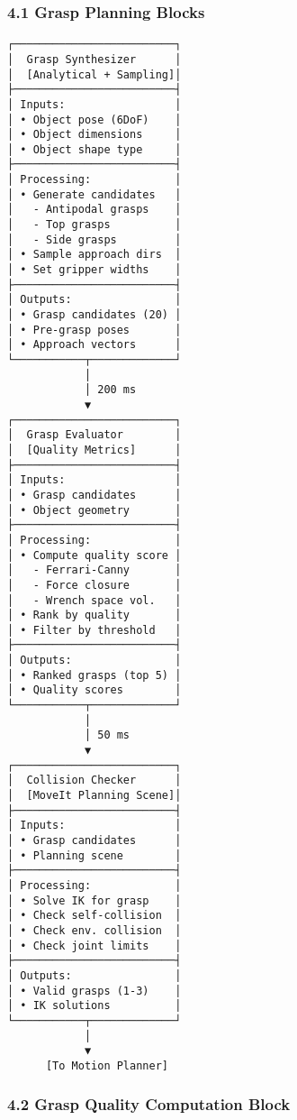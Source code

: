 \documentclass[
]{article}
\begin{document}
\hypertarget{grasp-planning-blocks}{%
\subsubsection{4.1 Grasp Planning Blocks}\label{grasp-planning-blocks}}

\begin{verbatim}
┌─────────────────────────┐
│  Grasp Synthesizer      │
│  [Analytical + Sampling]│
├─────────────────────────┤
│ Inputs:                 │
│ • Object pose (6DoF)    │
│ • Object dimensions     │
│ • Object shape type     │
├─────────────────────────┤
│ Processing:             │
│ • Generate candidates   │
│   - Antipodal grasps    │
│   - Top grasps          │
│   - Side grasps         │
│ • Sample approach dirs  │
│ • Set gripper widths    │
├─────────────────────────┤
│ Outputs:                │
│ • Grasp candidates (20) │
│ • Pre-grasp poses       │
│ • Approach vectors      │
└───────────┬─────────────┘
            │
            │ 200 ms
            ▼
┌─────────────────────────┐
│  Grasp Evaluator        │
│  [Quality Metrics]      │
├─────────────────────────┤
│ Inputs:                 │
│ • Grasp candidates      │
│ • Object geometry       │
├─────────────────────────┤
│ Processing:             │
│ • Compute quality score │
│   - Ferrari-Canny       │
│   - Force closure       │
│   - Wrench space vol.   │
│ • Rank by quality       │
│ • Filter by threshold   │
├─────────────────────────┤
│ Outputs:                │
│ • Ranked grasps (top 5) │
│ • Quality scores        │
└───────────┬─────────────┘
            │
            │ 50 ms
            ▼
┌─────────────────────────┐
│  Collision Checker      │
│  [MoveIt Planning Scene]│
├─────────────────────────┤
│ Inputs:                 │
│ • Grasp candidates      │
│ • Planning scene        │
├─────────────────────────┤
│ Processing:             │
│ • Solve IK for grasp    │
│ • Check self-collision  │
│ • Check env. collision  │
│ • Check joint limits    │
├─────────────────────────┤
│ Outputs:                │
│ • Valid grasps (1-3)    │
│ • IK solutions          │
└───────────┬─────────────┘
            │
            ▼
      [To Motion Planner]
\end{verbatim}

\hypertarget{grasp-quality-computation-block}{%
\subsubsection{4.2 Grasp Quality Computation
Block}\label{grasp-quality-computation-block}}
\end{document}

